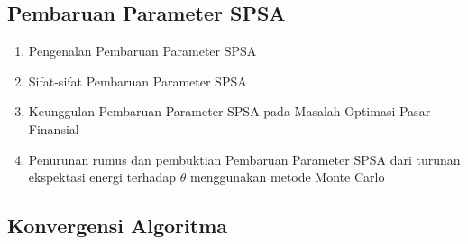 \subsection{Pembaruan Parameter SPSA}
\begin{enumerate}
    \item Pengenalan Pembaruan Parameter SPSA
    \item Sifat-sifat Pembaruan Parameter SPSA
    \item Keunggulan Pembaruan Parameter SPSA pada Masalah Optimasi Pasar Finansial
    \item Penurunan rumus dan pembuktian Pembaruan Parameter SPSA dari turunan ekspektasi energi terhadap $\theta$ menggunakan metode Monte Carlo
\end{enumerate}

\subsection{Konvergensi Algoritma}
